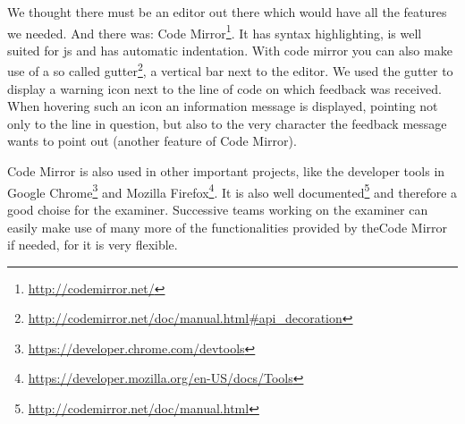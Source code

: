 We thought there must be an editor out there
which would have all the features we needed.
And there was: Code Mirror\footnote{\url{http://codemirror.net/}}.
It has syntax highlighting,
is well suited for \gls{js}
and has automatic indentation.
With code mirror you can also make use of a so called
gutter\footnote{\url{http://codemirror.net/doc/manual.html\#api_decoration}},
a vertical bar next to the editor.
We used the gutter to display a warning icon next to the line of code
on which feedback was received.
When hovering such an icon an information message is displayed,
pointing not only to the line in question,
but also to the very character the feedback message wants to point out
(another feature of Code Mirror).

Code Mirror is also used in other important projects,
like the developer tools in
Google Chrome\footnote{\url{https://developer.chrome.com/devtools}} and
Mozilla Firefox\footnote{\url{https://developer.mozilla.org/en-US/docs/Tools}}.
It is also
well documented\footnote{\url{http://codemirror.net/doc/manual.html}}
and therefore a good choise for the \gls{examiner}.
Successive teams working on the \gls{examiner}
can easily make use of many more of
the functionalities provided by theCode Mirror if needed,
for it is very flexible.
